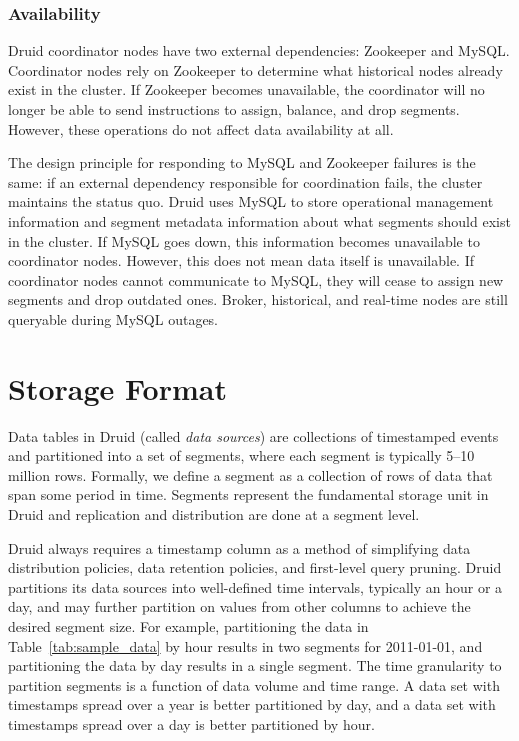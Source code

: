 \documentclass{acm_proc_article-sp}
\begin{document}
\subsubsection{Availability}
Druid coordinator nodes have two external dependencies: Zookeeper and MySQL.
Coordinator nodes rely on Zookeeper to determine what historical nodes already
exist in the cluster. If Zookeeper becomes unavailable, the coordinator will no
longer be able to send instructions to assign, balance, and drop segments.
However, these operations do not affect data availability at all.

The design principle for responding to MySQL and Zookeeper failures is the
same: if an external dependency responsible for coordination fails, the cluster
maintains the status quo. Druid uses MySQL to store operational management
information and segment metadata information about what segments should exist
in the cluster.  If MySQL goes down, this information becomes unavailable to
coordinator nodes. However, this does not mean data itself is unavailable. If
coordinator nodes cannot communicate to MySQL, they will cease to assign new
segments and drop outdated ones. Broker, historical, and real-time nodes are still
queryable during MySQL outages.

\section{Storage Format}
\label{sec:storage-format}
Data tables in Druid (called \emph{data sources}) are collections of
timestamped events and partitioned into a set of segments, where each segment
is typically 5--10 million rows. Formally, we define a segment as a collection
of rows of data that span some period in time. Segments represent the
fundamental storage unit in Druid and replication and distribution are done at
a segment level.
 
Druid always requires a timestamp column as a method of simplifying data
distribution policies, data retention policies, and first-level query pruning.
Druid partitions its data sources into well-defined time intervals, typically
an hour or a day, and may further partition on values from other columns to
achieve the desired segment size.  For example, partitioning the data in
Table~\ref{tab:sample_data} by hour results in two segments for 2011-01-01, and
partitioning the data by day results in a single segment.  The time granularity
to partition segments is a function of data volume and time range. A data set
with timestamps spread over a year is better partitioned by day, and a data set
with timestamps spread over a day is better partitioned by hour.
\end{document}

